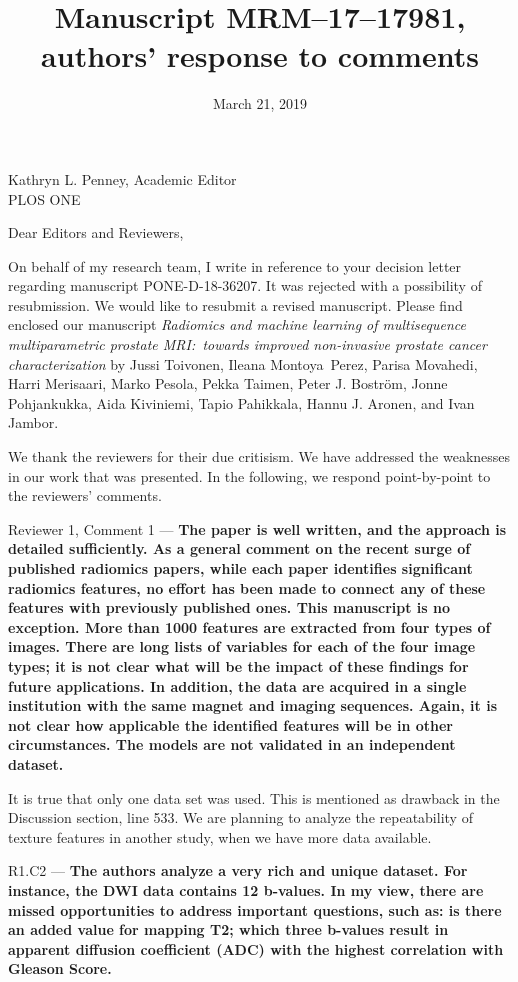 \documentclass{letter}
\title{Manuscript MRM--17--17981, authors' response to comments}
\date{March 21, 2019}
\newenvironment{comment}[1]%
  {\vspace{5ex}\par\textsf{#1 ---}\ignorespaces\bfseries}%
  {\par\ignorespacesafterend}
\newenvironment{reply}%
  {\vspace{2ex}\par}%
  {\par\upshape}
\begin{document}
\begin{letter}{Kathryn L. Penney, Academic Editor \\ PLOS ONE}
\opening{Dear Editors and Reviewers,}

On behalf of my research team, I write in reference to your decision letter
regarding manuscript PONE-D-18-36207. It was rejected with a possibility of
resubmission. We would like to resubmit a revised manuscript. Please find
enclosed our manuscript \emph{Radiomics and machine learning of multisequence
multiparametric prostate MRI:\ towards improved non-invasive prostate cancer
characterization} by Jussi Toivonen, Ileana Montoya~Perez, Parisa Movahedi,
Harri Merisaari, Marko Pesola, Pekka Taimen, Peter J. Boström, Jonne
Pohjankukka, Aida Kiviniemi, Tapio Pahikkala, Hannu J. Aronen, and Ivan Jambor.

We thank the reviewers for their due critisism. We have addressed the weaknesses
in our work that was presented. In the following, we respond point-by-point to
the reviewers' comments.


\begin{comment}{Reviewer 1, Comment 1}
The paper is well written, and the approach is detailed sufficiently. As a
general comment on the recent surge of published radiomics papers, while each
paper identifies significant radiomics features, no effort has been made to
connect any of these features with previously published ones. This manuscript is
no exception. More than 1000 features are extracted from four types of images.
There are long lists of variables for each of the four image types; it is not
clear what will be the impact of these findings for future applications. In
addition, the data are acquired in a single institution with the same magnet and
imaging sequences. Again, it is not clear how applicable the identified features
will be in other circumstances. The models are not validated in an independent
dataset.
\end{comment}

\begin{reply}
It is true that only one data set was used. This is mentioned as drawback in the
Discussion section, line 533. We are planning to analyze the repeatability of
texture features in another study, when we have more data available.
\end{reply}


\begin{comment}{R1.C2}
The authors analyze a very rich and unique dataset. For instance, the DWI data
contains 12 b-values. In my view, there are missed opportunities to address
important questions, such as: is there an added value for mapping T2; which
three b-values result in apparent diffusion coefficient (ADC) with the highest
correlation with Gleason Score.
\end{comment}


\end{letter}
\end{document}

